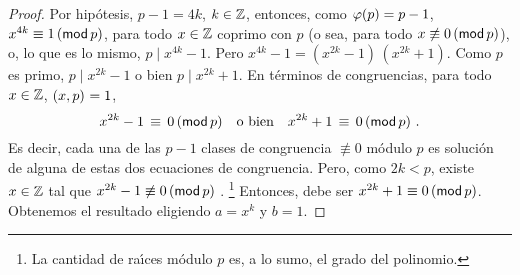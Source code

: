 \begin{proof}
	Por hip\'otesis, $p-1=4k$, $k\in\Enteros$,
	entonces,
	como $\eulerphi(p)=p-1$,
	$x^{4k}\equiv 1\tmodulo[p]$, para todo $x\in\Enteros$ coprimo con $p$
	(o sea, para todo $x\not\equiv 0\tmodulo[p]$), o, lo que es lo mismo,
	$p\mid x^{4k}-1$. Pero $x^{4k}-1=(x^{2k}-1)\,(x^{2k}+1)$. Como $p$ es
	primo, $p\mid x^{2k}-1$ o bien $p\mid x^{2k}+1$. En t\'erminos de
	congruencias, para todo $x\in\Enteros$, $\mcd{x,p}=1$,
	\begin{displaymath}
		x^{2k}-1\,\equiv\,0\tmodulo[p]
			\quad\text{o bien}\quad
			x^{2k}+1\,\equiv\,0\tmodulo[p]
			\text{ .}
	\end{displaymath}
	Es decir, cada una de las $p-1$ clases de congruencia $\not\equiv 0$
	m\'odulo $p$ es soluci\'on de alguna de estas dos ecuaciones de
	congruencia. Pero, como $2k<p$, existe $x\in\Enteros$ tal que
	$x^{2k}-1\not\equiv 0\tmodulo[p]$ \quedacomoejercicio.%
	\footnote{
		La cantidad de ra\'{\i}ces m\'odulo $p$ es, a lo sumo,
		el grado del polinomio.
	}
	Entonces, debe ser $x^{2k}+1\equiv 0\tmodulo[p]$.
	Obtenemos el resultado eligiendo $a=x^k$ y $b=1$.
\end{proof}

% 

